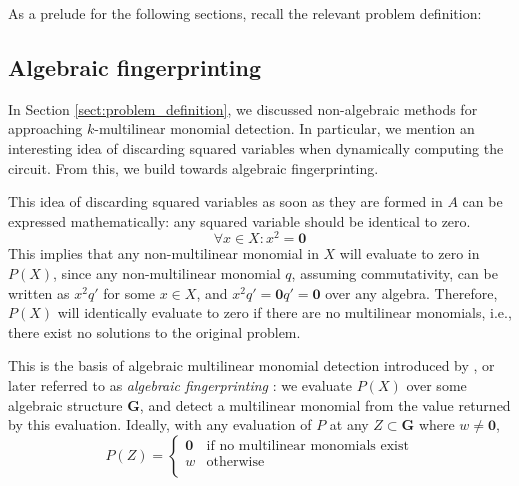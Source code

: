 As a prelude for the following sections, recall the relevant problem definition: 
\begin{problem}
\end{problem}

\subsection{Algebraic fingerprinting}
\label{sect:algebraic_fingerprinting}

In Section \ref{sect:problem_definition}, we discussed non-algebraic methods 
for approaching $k$-multilinear monomial detection. In particular, we mention
an interesting idea of discarding squared variables when dynamically 
computing the circuit. From this, we build towards algebraic fingerprinting. 

This idea of discarding squared variables as soon as they are formed in $A$ 
can be expressed mathematically: any squared variable should be identical to
zero. 
\begin{equation}
  \label{eq:squared_to_zero}
\forall x \in X: x^2 = \mathbf{0}
\end{equation}
This implies that any non-multilinear monomial in $X$ will evaluate to zero in $P(X)$, since 
any non-multilinear monomial $q$, assuming commutativity, can be written as $x^2q'$ 
for some $x \in X$, and $x^2q' = \mathbf{0}q' = \mathbf{0}$ over any algebra. 
Therefore, $P(X)$ will identically evaluate to zero if there are no multilinear monomials, 
i.e., there exist no solutions to the original problem.

This is the basis of algebraic multilinear monomial detection introduced by 
\citeauthor{Koutis08} \cite{Koutis08}, 
or later referred to as \emph{algebraic fingerprinting} \cite{KouWil15}: 
we evaluate $P(X)$ over some algebraic structure $\mathbf{G}$, 
and detect a multilinear monomial from 
the value returned by this evaluation. Ideally, with any 
evaluation of $P$ at any $Z \subset \mathbf{G}$ 
where $w \neq \mathbf{0}$, 
\begin{equation}
  \label{eq:polynomial_identity}
  P(Z) =
    \begin{cases}
      \mathbf{0} & \text{if no multilinear monomials exist}\\
      w & \text{otherwise}\\
    \end{cases}       
\end{equation}

